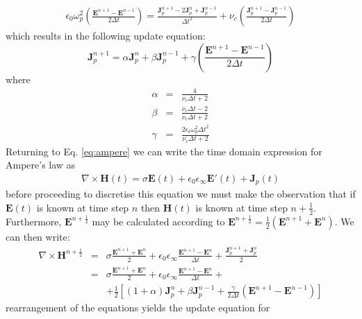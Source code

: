\documentclass[a4paper, 12pt]{article}
\begin{document}
	\begin{eqnarray}
		\epsilon_0\omega_p^2\left(\frac{\boldsymbol{E}^{n+1}-\boldsymbol{E}^{n-1}}{2\Delta
			t}\right)=\frac{\boldsymbol{J}_p^{n+1}-2\boldsymbol{J}_p^{n}+\boldsymbol{J}_p^{n-1}}{\Delta t^2}+\nu_c\left(\frac{\boldsymbol{J}_p^{n+1}-\boldsymbol{J}_p^{n-1}}{2\Delta
			t}\right)
	\end{eqnarray}
	which results in the following update equation:
	\begin{equation}
		\boldsymbol{J}_p^{n+1}=\alpha\boldsymbol{J}_p^{n}+\beta\boldsymbol{J}_p^{n-1}+\gamma\left(\frac{\boldsymbol{E}^{n+1}-\boldsymbol{E}^{n-1}}{2\Delta
			t}\right)\label{eq:jpmaster}
	\end{equation}
	where
	\begin{eqnarray}
		\alpha&=&\frac{4}{\nu_c\Delta t+2}\\
		\beta&=&\frac{\nu_c\Delta t-2}{\nu_c\Delta t+2}\\
		\gamma&=&\frac{2\epsilon_0\omega_p^2\Delta t^2}{\nu_c\Delta t+2}
	\end{eqnarray}
	Returning to Eq. \ref{eq:ampere} we can write the time domain
	expression for Ampere's law as
	\begin{eqnarray}
		\nabla\times\boldsymbol{H}(t)=\sigma\boldsymbol{E}(t)+\epsilon_0\epsilon_\infty\boldsymbol{E}'(t)+\boldsymbol{J}_p(t)
	\end{eqnarray}
	before proceeding to discretise this equation we must make the
	observation that if $\boldsymbol{E}(t)$ is known at time step $n$ then
	$\boldsymbol{H}(t)$ is known at time step
	$n+\frac{1}{2}$. Furthermore, $\boldsymbol{E}^{n+\frac{1}{2}}$ may be
	calculated according to
	$\boldsymbol{E}^{n+\frac{1}{2}}=\frac{1}{2}(\boldsymbol{E}^{n+1}+\boldsymbol{E}^{n})$.
	We can then write:
	\begin{eqnarray}
		\nabla\times\boldsymbol{H}^{n+\frac{1}{2}}&=&\sigma\frac{\boldsymbol{E}^{n+1}+\boldsymbol{E}^{n}}{2}+\epsilon_0\epsilon_\infty\frac{\boldsymbol{E}^{n+1}-\boldsymbol{E}^{n}}{\Delta
			t}+\frac{\boldsymbol{J}_p^{n+1}+\boldsymbol{J}_p^{n}}{2}\\
		&=&\sigma\frac{\boldsymbol{E}^{n+1}+\boldsymbol{E}^{n}}{2}+\epsilon_0\epsilon_\infty\frac{\boldsymbol{E}^{n+1}-\boldsymbol{E}^{n}}{\Delta
			t}+\nonumber\\&&+\frac{1}{2}\left[(1+\alpha)\boldsymbol{J}_p^{n}+\beta\boldsymbol{J}_p^{n-1}+\frac{\gamma}{2\Delta
			t}\left(\boldsymbol{E}^{n+1}-\boldsymbol{E}^{n-1}\right)\right]
	\end{eqnarray}
	rearrangement of the equations yields the update equation for
\end{document}
